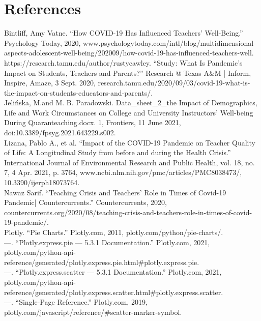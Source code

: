 \documentclass{article}
\begin{document}
\section{References}
\begin{hangparas}{.25in}{1}
Bintliff, Amy Vatne. “How COVID-19 Has Influenced Teachers’ Well-Being.” Psychology Today, 2020, www.psychologytoday.com/intl/blog/multidimensional-aspects-adolescent-well-being/202009/how-covid-19-has-influenced-teachers-well.\\

https://research.tamu.edu/author/rustycawley. “Study: What Is Pandemic’s Impact on Students, Teachers and Parents?” Research @ Texas A&M | Inform, Inspire, Amaze, 3 Sept. 2020, research.tamu.edu/2020/09/03/covid-19-what-is-the-impact-on-students-educators-and-parents/.\\

Jelińska, M.and M. B. Paradowski. Data\_sheet\_2\_the Impact of Demographics, Life and Work Circumstances on College and University Instructors’ Well-being During Quaranteaching.docx. 1, Frontiers, 11 June 2021, doi:10.3389/fpsyg.2021.643229.s002.\\

Lizana, Pablo A., et al. “Impact of the COVID-19 Pandemic on Teacher Quality of Life: A Longitudinal Study from before and during the Health Crisis.” International Journal of Environmental Research and Public Health, vol. 18, no. 7, 4 Apr. 2021, p. 3764, www.ncbi.nlm.nih.gov/pmc/articles/PMC8038473/, 10.3390/ijerph18073764.\\

Nawaz Sarif. “Teaching Crisis and Teachers’ Role in Times of Covid-19 Pandemic| Countercurrents.” Countercurrents, 2020, countercurrents.org/2020/08/teaching-crisis-and-teachers-role-in-times-of-covid-19-pandemic/.\\

Plotly. “Pie Charts.” Plotly.com, 2011, plotly.com/python/pie-charts/.\\

---. “Plotly.express.pie —  5.3.1 Documentation.” Plotly.com, 2021, plotly.com/python-api-reference/generated/plotly.express.pie.html#plotly.express.pie.\\

---. “Plotly.express.scatter —  5.3.1 Documentation.” Plotly.com, 2021, plotly.com/python-api-reference/generated/plotly.express.scatter.html#plotly.express.scatter.\\

---. “Single-Page Reference.” Plotly.com, 2019, plotly.com/javascript/reference/#scatter-marker-symbol.\\


\end{hangparas}
\end{document}
